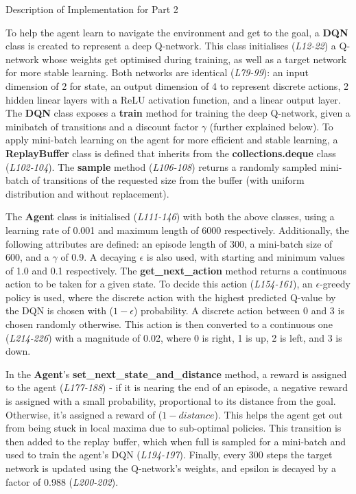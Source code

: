 \documentclass[12pt]{article}
\begin{document}
\begin{center}
    \large{Description of Implementation for Part 2}
\end{center}
\vspace{1cm}
To help the agent learn to navigate the environment and get to the goal, a \textbf{DQN} class is created to represent a deep Q-network. This class initialises (\textit{L12-22}) a Q-network whose weights get optimised during training, as well as a target network for more stable learning. Both networks are identical (\textit{L79-99}): an input dimension of 2 for state, an output dimension of 4 to represent discrete actions, 2 hidden linear layers with a ReLU activation function, and a linear output layer. The \textbf{DQN} class exposes a \textbf{train} method for training the deep Q-network, given a minibatch of transitions and a discount factor \(\gamma\) (further explained below). To apply mini-batch learning on the agent for more efficient and stable learning, a \textbf{ReplayBuffer} class is defined that inherits from the \textbf{collections.deque} class (\textit{L102-104}). The \textbf{sample} method (\textit{L106-108}) returns a randomly sampled mini-batch of transitions of the requested size from the buffer (with uniform distribution and without replacement).

The \textbf{Agent} class is initialised (\textit{L111-146}) with both the above classes, using a learning rate of 0.001 and maximum length of 6000 respectively. Additionally, the following attributes are defined: an episode length of 300, a mini-batch size of 600, and a \(\gamma\) of 0.9. A decaying \(\epsilon\) is also used, with starting and minimum values of 1.0 and 0.1 respectively. The \textbf{get\_next\_action} method returns a continuous action to be taken for a given state. To decide this action (\textit{L154-161}), an \(\epsilon\)-greedy policy is used, where the discrete action with the highest predicted Q-value by the DQN is chosen with (\(1-\epsilon\)) probability. A discrete action between 0 and 3 is chosen randomly otherwise. This action is then converted to a continuous one (\textit{L214-226}) with a magnitude of 0.02, where 0 is right, 1 is up, 2 is left, and 3 is down.

In the \textbf{Agent}'s \textbf{set\_next\_state\_and\_distance} method, a reward is assigned to the agent (\textit{L177-188}) - if it is nearing the end of an episode, a negative reward is assigned with a small probability, proportional to its distance from the goal. Otherwise, it's assigned a reward of (\(1-distance\)). This helps the agent get out from being stuck in local maxima due to sub-optimal policies. This transition is then added to the replay buffer, which when full is sampled for a mini-batch and used to train the agent's DQN (\textit{L194-197}). Finally, every 300 steps the target network is updated using the Q-network's weights, and epsilon is decayed by a factor of 0.988 (\textit{L200-202}).
\end{document}
